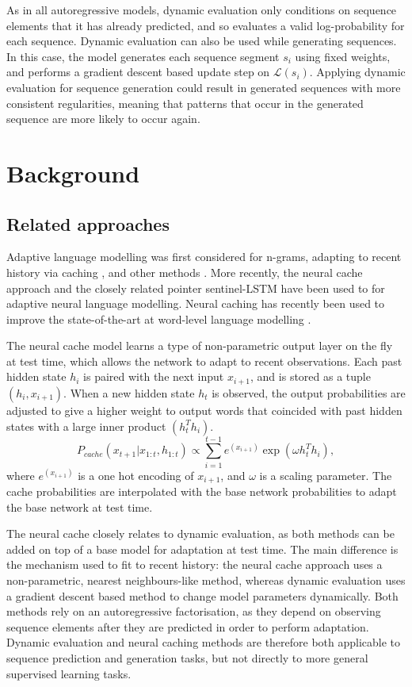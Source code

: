 \documentclass{article}
\begin{document}
As in all autoregressive models, dynamic evaluation only conditions on sequence elements that it has already predicted, and so evaluates a valid log-probability for each sequence. Dynamic evaluation can also be used while generating sequences. In this case, the model generates each sequence segment $s_i$ using fixed weights, and performs a gradient descent based update step on $\mathcal{L}(s_i)$. Applying dynamic evaluation for sequence generation could result in generated sequences with more consistent regularities, meaning that patterns that occur in the generated sequence are more likely to occur again.

\section{Background}

\subsection{Related approaches}

Adaptive language modelling was first considered for n-grams, adapting to recent history via caching \citep{jelinek1991,kuhn1988}, and other methods \citet{bellegarda2004adaptation}. More recently, the neural cache approach \citep{grave2017} and the closely related pointer sentinel-LSTM \citep{Merity2016} have been used to for adaptive neural language modelling. Neural caching has recently been used to improve the state-of-the-art at word-level language modelling \citep{merity2017}.

The neural cache model learns a type of non-parametric output layer on the fly at test time, which allows the network to adapt to recent observations. Each past hidden state $h_i$ is paired with the next input $x_{i+1}$, and is stored as a tuple $(h_i,x_{i+1})$. When a new hidden state $h_t$ is observed, the output probabilities are adjusted to give a higher weight to output words that coincided with past hidden states with a large inner product $(h_t^T h_i)$. 
\begin{equation}
P_{cache}(x_{t+1}|x_{1:t},h_{1:t})  \propto \sum^{t-1}_{i=1} e^{(x_{i+1})} \exp(\omega h_t^T h_i),
\end{equation}
where $e^{(x_{i+1})}$ is a one hot encoding of $x_{i+1}$, and $\omega$ is a scaling parameter. The cache probabilities are interpolated with the base network probabilities to adapt the base network at test time.

The neural cache closely relates to dynamic evaluation, as both methods can be added on top of a base model for adaptation at test time. The main difference is the mechanism used to fit to recent history: the neural cache approach uses a non-parametric, nearest neighbours-like method, whereas dynamic evaluation uses a gradient descent based method to change model parameters dynamically. Both methods rely on an autoregressive factorisation, as they depend on observing sequence elements after they are predicted in order to perform adaptation. Dynamic evaluation and neural caching methods are therefore both applicable to sequence prediction and generation tasks, but not directly to more general supervised learning tasks.
\end{document}
